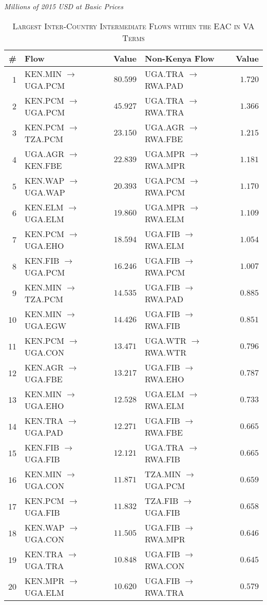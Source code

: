 \documentclass[a4paper]{article}
\begin{document}
\begin{table}[!htbp] \vspace{-2mm}
  \centering 
  \caption{\textsc{Largest Inter-Country Intermediate Flows within the EAC in VA Terms}} 
  \small{\textit{Millions of 2015 USD at Basic Prices}}
  \label{tab:VAeaclfl} 
  \vspace{2mm}
\begin{tabular}{rlrlr} \toprule
\textbf{\#} & \textbf{Flow} & \textbf{Value} & \textbf{Non-Kenya Flow} & \textbf{Value} \\ 
\midrule
1 & KEN.MIN $\to$  UGA.PCM & $80.599$ & UGA.TRA $\to$  RWA.PAD & $1.720$ \\ 
2 & KEN.PCM $\to$  UGA.PCM & $45.927$ & UGA.TRA $\to$  RWA.TRA & $1.366$ \\ 
3 & KEN.PCM $\to$  TZA.PCM & $23.150$ & UGA.AGR $\to$  RWA.FBE & $1.215$ \\ 
4 & UGA.AGR $\to$  KEN.FBE & $22.839$ & UGA.MPR $\to$  RWA.MPR & $1.181$ \\ 
5 & KEN.WAP $\to$  UGA.WAP & $20.393$ & UGA.PCM $\to$  RWA.PCM & $1.170$ \\ 
6 & KEN.ELM $\to$  UGA.ELM & $19.860$ & UGA.MPR $\to$  RWA.ELM & $1.109$ \\ 
7 & KEN.PCM $\to$  UGA.EHO & $18.594$ & UGA.FIB $\to$  RWA.ELM & $1.054$ \\ 
8 & KEN.FIB $\to$  UGA.PCM & $16.246$ & UGA.FIB $\to$  RWA.PCM & $1.007$ \\ 
9 & KEN.MIN $\to$  TZA.PCM & $14.535$ & UGA.FIB $\to$  RWA.PAD & $0.885$ \\ 
10 & KEN.MIN $\to$  UGA.EGW & $14.426$ & UGA.FIB $\to$  RWA.FIB & $0.851$ \\ 
11 & KEN.PCM $\to$  UGA.CON & $13.471$ & UGA.WTR $\to$  RWA.WTR & $0.796$ \\ 
12 & KEN.AGR $\to$  UGA.FBE & $13.217$ & UGA.FIB $\to$  RWA.EHO & $0.787$ \\ 
13 & KEN.MIN $\to$  UGA.EHO & $12.528$ & UGA.ELM $\to$  RWA.ELM & $0.733$ \\ 
14 & KEN.TRA $\to$  UGA.PAD & $12.271$ & UGA.FIB $\to$  RWA.FBE & $0.665$ \\ 
15 & KEN.FIB $\to$  UGA.FIB & $12.121$ & UGA.TRA $\to$  RWA.FIB & $0.665$ \\ 
16 & KEN.MIN $\to$  UGA.CON & $11.871$ & TZA.MIN $\to$  UGA.PCM & $0.659$ \\ 
17 & KEN.PCM $\to$  UGA.FIB & $11.832$ & TZA.FIB $\to$  UGA.FIB & $0.658$ \\ 
18 & KEN.WAP $\to$  UGA.CON & $11.505$ & UGA.FIB $\to$  RWA.MPR & $0.646$ \\ 
19 & KEN.TRA $\to$  UGA.TRA & $10.848$ & UGA.FIB $\to$  RWA.CON & $0.645$ \\ 
20 & KEN.MPR $\to$  UGA.ELM & $10.620$ & UGA.FIB $\to$  RWA.TRA & $0.579$ \\ 
\bottomrule
\end{tabular} 
\end{table} 
\FloatBarrier
\end{document}
